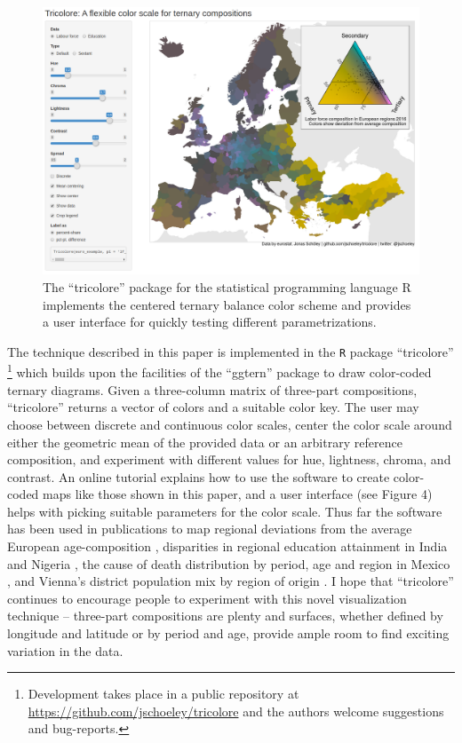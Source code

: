 \documentclass[10pt, twoside, parskip=half]{article}
\makeatletter
\def\maxwidth{\ifdim\Gin@nat@width>\linewidth\linewidth
\else\Gin@nat@width\fi}
\let\Oldincludegraphics\includegraphics
\renewcommand{\includegraphics}[1]{\Oldincludegraphics[width=\maxwidth]{#1}}
\makeatother
\begin{document}
\begin{figure}
\centering
\includegraphics{figure4.png}
\caption{The ``tricolore'' package for the statistical programming
language R implements the centered ternary balance color scheme and
provides a user interface for quickly testing different
parametrizations.}
\end{figure}

The technique described in this paper is implemented in the \texttt{R}
package ``tricolore'' \citep{Schoeley2019a}\footnote{Development takes
  place in a public repository at
  \url{https://github.com/jschoeley/tricolore} and the authors welcome
  suggestions and bug-reports.} which builds upon the facilities of the
``ggtern'' package \citep{Hamilton2018} to draw color-coded ternary
diagrams. Given a three-column matrix of three-part compositions,
``tricolore'' returns a vector of colors and a suitable color key. The
user may choose between discrete and continuous color scales, center the
color scale around either the geometric mean of the provided data or an
arbitrary reference composition, and experiment with different values
for hue, lightness, chroma, and contrast. An online tutorial
\citep{Schoeley2019b} explains how to use the software to create
color-coded maps like those shown in this paper, and a user interface
(see Figure 4) helps with picking suitable parameters for the color
scale. Thus far the software has been used in publications to map
regional deviations from the average European age-composition
\citep{Kashnitsky2018, Schoeley2019}, disparities in regional education
attainment in India and Nigeria \citep{Graetz2019}, the cause of death
distribution by period, age and region in Mexico \citep{Kashnitsky2019},
and Vienna's district population mix by region of origin
\citep{StadtWien2019}. I hope that ``tricolore'' continues to encourage
people to experiment with this novel visualization technique --
three-part compositions are plenty and surfaces, whether defined by
longitude and latitude or by period and age, provide ample room to find
exciting variation in the data.
\end{document}
